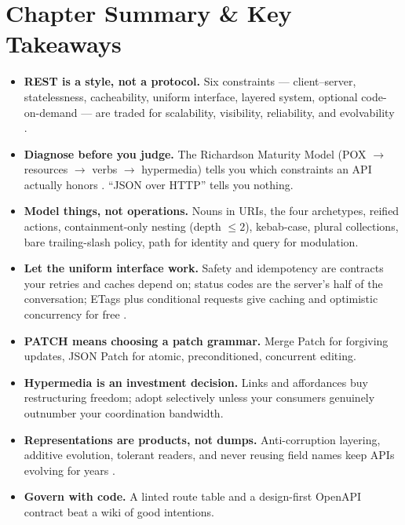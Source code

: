\section{Chapter Summary \& Key Takeaways}

\begin{itemize}
  \item \textbf{REST is a style, not a protocol.} Six constraints ---
        client--server, statelessness, cacheability, uniform interface, layered
        system, optional code-on-demand --- are traded for scalability,
        visibility, reliability, and evolvability \cite{fielding2000rest}.
  \item \textbf{Diagnose before you judge.} The Richardson Maturity Model
        (POX $\rightarrow$ resources $\rightarrow$ verbs $\rightarrow$
        hypermedia) tells you which constraints an API actually honors
        \cite{richardson2013restful}. ``JSON over HTTP'' tells you nothing.
  \item \textbf{Model things, not operations.} Nouns in URIs, the four
        archetypes, reified actions, containment-only nesting (depth $\le 2$),
        kebab-case, plural collections, bare trailing-slash policy, path for
        identity and query for modulation.
  \item \textbf{Let the uniform interface work.} Safety and idempotency are
        contracts your retries and caches depend on; status codes are the
        server's half of the conversation; ETags plus conditional requests give
        caching and optimistic concurrency for free \cite{rfc9110}.
  \item \textbf{PATCH means choosing a patch grammar.} Merge Patch for
        forgiving updates, JSON Patch for atomic, preconditioned, concurrent
        editing.
  \item \textbf{Hypermedia is an investment decision.} Links and affordances
        \cite{rfc8288} buy restructuring freedom; adopt selectively unless your
        consumers genuinely outnumber your coordination bandwidth.
  \item \textbf{Representations are products, not dumps.} Anti-corruption
        layering, additive evolution, tolerant readers, and never reusing field
        names keep APIs evolving for years \cite{kleppmann2017ddia,gehl2021apidesign}.
  \item \textbf{Govern with code.} A linted route table and a design-first
        OpenAPI contract \cite{openapi31} beat a wiki of good intentions.
\end{itemize}

